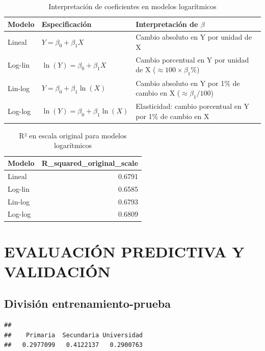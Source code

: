 \documentclass[
  oneside]{book}
\begin{document}
\begin{table}[!h]
\centering
\caption{\label{tab:transformaciones-log}Interpretación de coeficientes en modelos logarítmicos}
\centering
\begin{tabular}[t]{l|l|l}
\hline
Modelo & Especificación & Interpretación de $\beta$\\
\hline
Lineal & $Y = \beta_0 + \beta_1 X$ & Cambio absoluto en Y por unidad de X\\
\hline
Log-lin & $\ln(Y) = \beta_0 + \beta_1 X$ & Cambio porcentual en Y por unidad de X ($\approx 100 \times \beta_1\%$)\\
\hline
Lin-log & $Y = \beta_0 + \beta_1 \ln(X)$ & Cambio absoluto en Y por 1\% de cambio en X ($\approx \beta_1/100$)\\
\hline
Log-log & $\ln(Y) = \beta_0 + \beta_1 \ln(X)$ & Elasticidad: cambio porcentual en Y por 1\% de cambio en X\\
\hline
\end{tabular}
\end{table}

\begin{table}
\centering
\caption{\label{tab:transformaciones-log}R² en escala original para modelos logarítmicos}
\centering
\begin{tabular}[t]{l|r}
\hline
Modelo & R\_squared\_original\_scale\\
\hline
Lineal & 0.6791\\
\hline
Log-lin & 0.6585\\
\hline
Lin-log & 0.6793\\
\hline
Log-log & 0.6809\\
\hline
\end{tabular}
\end{table}

\section{EVALUACIÓN PREDICTIVA Y VALIDACIÓN}\label{evaluaciuxf3n-predictiva-y-validaciuxf3n}

\subsection{División entrenamiento-prueba}\label{divisiuxf3n-entrenamiento-prueba}

\begin{verbatim}
## 
##    Primaria  Secundaria Universidad 
##   0.2977099   0.4122137   0.2900763
\end{verbatim}
\end{document}
